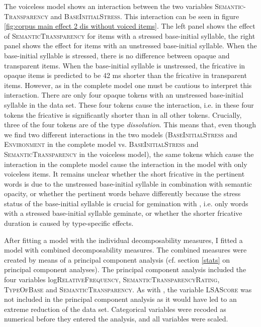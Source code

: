 The voiceless model shows an interaction between the two variables \textsc{Semantic-Transparency} and \textsc{BaseInitialStress}. This interaction can be seen in figure \ref{fig:corpus main effect 2 dis without voiced items}. The left panel shows the effect of \textsc{SemanticTransparency} for items with a stressed base-initial syllable, the right panel shows the effect for items with an unstressed base-initial syllable. When the base-initial syllable is stressed, there is no difference between opaque and transparent items. When the base-initial syllable is unstressed, the fricative in opaque items is predicted to be 42 ms shorter than the fricative in transparent items. However, as in the complete model one must be cautious to  interpret this interaction. There are only four opaque tokens with an unstressed base-initial syllable in the data set. These four tokens cause the interaction, i.e. in these four tokens the fricative is significantly shorter than in all other tokens. 
Crucially, three of the four tokens are of the type \textit{dissolution}. This means that, even though we find two different interactions in the two models (\textsc{BaseInitialStress} and \textsc{Environment} in the complete model vs. \textsc{BaseInitialStress} and \textsc{SemanticTransparency} in the voiceless model), the same tokens which cause the interaction in the complete model cause the interaction in the model with only voiceless items. It remains unclear whether the short fricative in the pertinent words is due to the unstressed base-initial syllable in combination with semantic opacity, or whether the pertinent words behave differently because the stress status of the base-initial syllable is crucial for gemination with , i.e. only words with a stressed base-initial syllable geminate, or whether the shorter fricative duration is caused by type-specific effects. 



After fitting a model with the individual decomposability measures, I fitted a model with combined decomposability measures. The combined measures were created by means of a principal component analysis (cf. section \ref{stats} on principal component analyses). 
The principal component analysis included the four variables log\textsc{RelativeFrequency}, \textsc{SemanticTransparencyRating}, \textsc{TypeOfBase} and \textsc{SemanticTransparency}. As with , the variable \textsc{LSAScore} was not included in the principal component analysis as it would have led to an extreme reduction of the data set. Categorical variables were recoded as numerical before they entered the analysis, and all variables were scaled.




